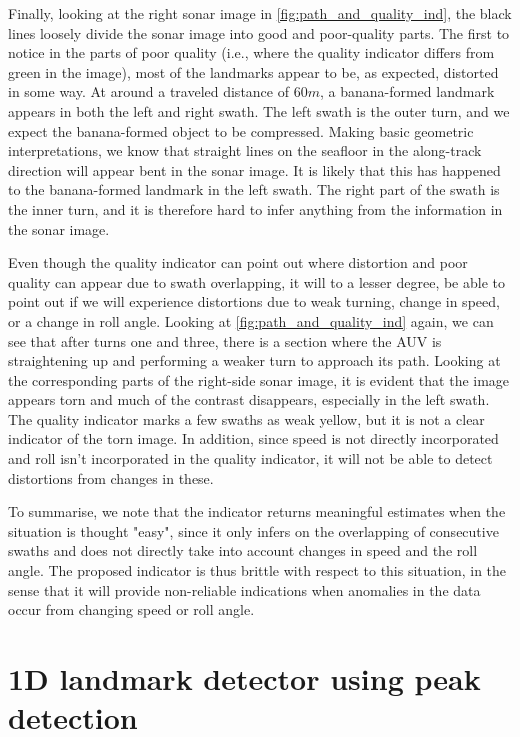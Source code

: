 Finally, looking at the right sonar image in \cref{fig:path_and_quality_ind}, the black lines loosely divide the sonar image into good and poor-quality parts. The first to notice in the parts of poor quality (i.e., where the quality indicator differs from green in the image), most of the landmarks appear to be, as expected, distorted in some way. At around a traveled distance of $60 m$, a banana-formed landmark appears in both the left and right swath. The left swath is the outer turn, and we expect the banana-formed object to be compressed. Making basic geometric interpretations, we know that straight lines on the seafloor in the along-track direction will appear bent in the sonar image. It is likely that this has happened to the banana-formed landmark in the left swath. The right part of the swath is the inner turn, and it is therefore hard to infer anything from the information in the sonar image.

Even though the quality indicator can point out where distortion and poor quality can appear due to swath overlapping, it will to a lesser degree, be able to point out if we will experience distortions due to weak turning, change in speed, or a change in roll angle. Looking at \cref{fig:path_and_quality_ind} again, we can see that after turns one and three, there is a section where the AUV is straightening up and performing a weaker turn to approach its path. Looking at the corresponding parts of the right-side sonar image, it is evident that the image appears torn and much of the contrast disappears, especially in the left swath. The quality indicator marks a few swaths as weak yellow, but it is not a clear indicator of the torn image. In addition, since speed is not directly incorporated and roll isn't incorporated in the quality indicator, it will not be able to detect distortions from changes in these.

To summarise, we note that the indicator returns meaningful estimates when the situation is thought "easy", since it only infers on the overlapping of consecutive swaths and does not directly take into account changes in speed and the roll angle. The proposed indicator is thus brittle with respect to this situation, in the sense that it will provide non-reliable indications when anomalies in the data occur from changing speed or roll angle.  

\section{1D landmark detector using peak detection} \label{sec:disc_1D_landmark_detector}

